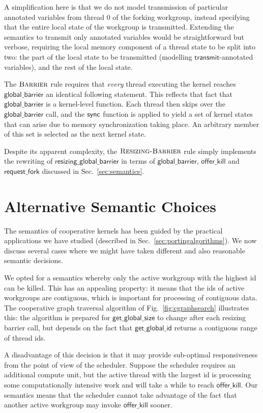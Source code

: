 \documentclass[parskip=half,sigconf,review, anonymous=true, acmcopyrightmode=none]{acmart}
\newcommand{\myfig}{Fig.~}
\newcommand{\mysec}{Sec.~}
\newcommand{\transmit}{\mathsf{transmit}}
\newcommand{\offerfork}{\mathsf{request\_fork}}
\newcommand{\offerkill}{\mathsf{offer\_kill}}
\newcommand{\globalbarrier}{\mathsf{global\_barrier}}
\newcommand{\resizingglobalbarrier}{\mathsf{resizing\_global\_barrier}}
\newcommand{\getglobalid}{\mathsf{get\_global\_id}}
\newcommand{\getglobalsize}{\mathsf{get\_global\_size}}
\begin{document}
A simplification here is that we do not model transmission of
particular annotated variables from thread 0 of the forking workgroup,
instead specifying that the entire local state of the workgroup is
transmitted.  Extending the semantics to transmit only annotated
variables would be straightforward but verbose, requiring the local
memory component of a thread state to be split into two: the part of
the local state to be transmitted (modelling $\transmit$-annotated
variables), and the rest of the local state.

The $\textsc{Barrier}$ rule requires that \emph{every} thread
executing the kernel reaches $\globalbarrier$ an identical following
statement.  This reflects that fact that $\globalbarrier$ is a
kernel-level function.  Each thread then skips over the
$\globalbarrier$ call, and the $\mathsf{sync}$ function is applied to yield
a set of kernel states that can arise due to memory synchronization
taking place.  An arbitrary member of this set is selected as the next
kernel state.

Despite its apparent complexity, the $\textsc{Resizing-Barrier}$ rule simply implements the rewriting of $\resizingglobalbarrier$ in terms of $\globalbarrier$, $\offerkill$ and $\offerfork$ discussed in \mysec\ref{sec:semantics}.


\section{Alternative Semantic Choices}\label{appendix:semanticalternatives}

The semantics of cooperative kernels has been guided by the practical
applications we have studied (described in
\mysec\ref{sec:portingalgorithms}).  We now discuss several cases
where we might have taken different and also reasonable semantic
decisions.

%
We opted for a semantics whereby only the active workgroup with the
highest id can be killed.  This has an appealing property: it means
that the ids of active workgroups are contiguous, which is important
for processing of contiguous data.  The cooperative graph traversal
algorithm of \myfig\ref{fig:cgraphsearch} illustrates this: the
algorithm is prepared for $\getglobalsize$ to change after each
resizing barrier call, but depends on the fact that $\getglobalid$
returns a contiguous range of thread ids.

A disadvantage of this decision is that it may provide sub-optimal
responsiveness from the point of view of the scheduler.  Suppose the
scheduler requires an additional compute unit, but the active thread
with the largest id is processing some computationally intensive work
and will take a while to reach $\offerkill$.  Our semantics means that
the scheduler cannot take advantage of the fact that another active
workgroup may invoke $\offerkill$ sooner.
\end{document}
